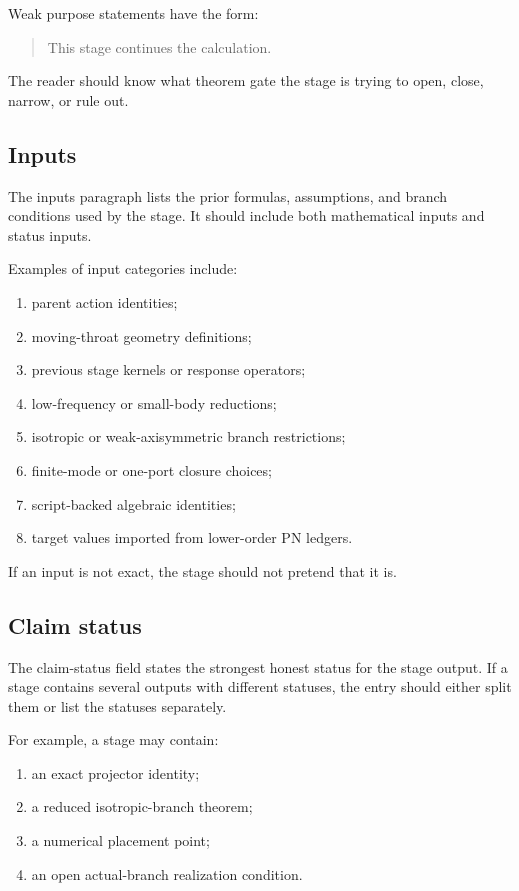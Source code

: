Weak purpose statements have the form:
\begin{quote}
This stage continues the calculation.
\end{quote}

The reader should know what theorem gate the stage is trying to open, close, narrow, or rule out.

\subsection{Inputs}
\label{subsec:stage-inputs}

The inputs paragraph lists the prior formulas, assumptions, and branch conditions used by the stage.  It should include both mathematical inputs and status inputs.

Examples of input categories include:
\begin{enumerate}[leftmargin=2.2em]
  \item parent action identities;
  \item moving-throat geometry definitions;
  \item previous stage kernels or response operators;
  \item low-frequency or small-body reductions;
  \item isotropic or weak-axisymmetric branch restrictions;
  \item finite-mode or one-port closure choices;
  \item script-backed algebraic identities;
  \item target values imported from lower-order PN ledgers.
\end{enumerate}

If an input is not exact, the stage should not pretend that it is.

\subsection{Claim status}
\label{subsec:stage-claim-status}

The claim-status field states the strongest honest status for the stage output.  If a stage contains several outputs with different statuses, the entry should either split them or list the statuses separately.

For example, a stage may contain:
\begin{enumerate}[leftmargin=2.2em]
  \item an exact projector identity;
  \item a reduced isotropic-branch theorem;
  \item a numerical placement point;
  \item an open actual-branch realization condition.
\end{enumerate}

